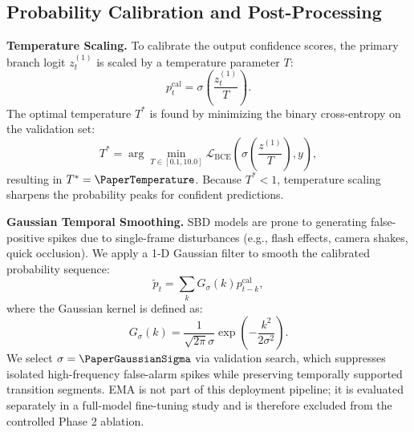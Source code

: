 \subsection{Probability Calibration and Post-Processing}

\textbf{Temperature Scaling.} To calibrate the output confidence scores, the primary branch logit $z_t^{(1)}$ is scaled by a temperature parameter $T$:
\begin{equation}
    p_t^{\mathrm{cal}} = \sigma\left(\frac{z_t^{(1)}}{T}\right).
\end{equation}
The optimal temperature $T^*$ is found by minimizing the binary cross-entropy on the validation set:
\begin{equation}
    T^* = \arg\min_{T\in[0.1,10.0]}
    \mathcal{L}_{\mathrm{BCE}}\left(\sigma\left(\frac{z^{(1)}}{T}\right),y\right),
\end{equation}
resulting in $T^*=\PaperTemperature$. Because $T^* < 1$, temperature scaling sharpens the probability peaks for confident predictions.

\textbf{Gaussian Temporal Smoothing.} SBD models are prone to generating false-positive spikes due to single-frame disturbances (e.g., flash effects, camera shakes, quick occlusion). We apply a 1-D Gaussian filter to smooth the calibrated probability sequence:
\begin{equation}
    \tilde{p}_t = \sum_{k} G_{\sigma}(k)p_{t-k}^{\mathrm{cal}},
\end{equation}
where the Gaussian kernel is defined as:
\begin{equation}
    G_{\sigma}(k)= \frac{1}{\sqrt{2\pi}\sigma}\exp\left(-\frac{k^2}{2\sigma^2}\right).
\end{equation}
We select $\sigma=\PaperGaussianSigma$ via validation search, which suppresses isolated high-frequency false-alarm spikes while preserving temporally supported transition segments. EMA is not part of this deployment pipeline; it is evaluated separately in a full-model fine-tuning study and is therefore excluded from the controlled Phase 2 ablation.
